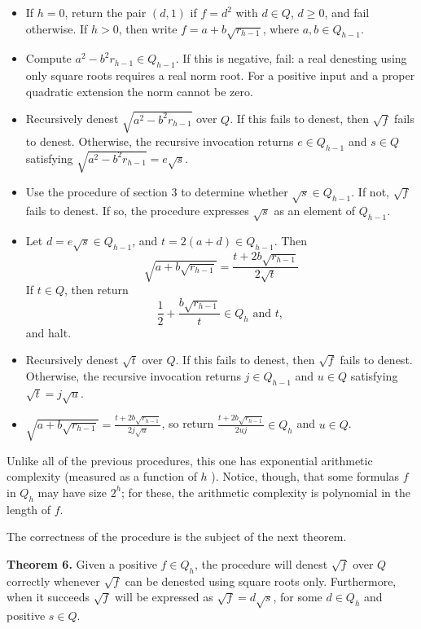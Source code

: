 \documentclass[11pt,letterpaper]{article}
\begin{document}
\begin{itemize}
  \item[1.] If $h=0$, return the pair $(d,1)$ if $f=d^2$ with $d\in Q$, $d\geq0$, and fail otherwise. If $h>0$, then write $f=a+b \sqrt{r_{h-1}}$, where $a, b \in Q_{h-1}$.
  \item[2.] Compute $a^2-b^2r_{h-1}\in Q_{h-1}$. If this is negative, fail: a real denesting using only square roots requires a real norm root. For a positive input and a proper quadratic extension the norm cannot be zero.
  \item[3.] Recursively denest $\sqrt{a^{2}-b^{2} r_{h-1}}$ over $Q$. If this fails to denest, then $\sqrt{f}$ fails to denest. Otherwise, the recursive invocation returns $e \in Q_{h-1}$ and $s \in Q$ satisfying $\sqrt{a^{2}-b^{2} r_{h-1}}=e \sqrt{s}$.
  \item[4.] Use the procedure of section 3 to determine whether $\sqrt{s} \in Q_{h-1}$. If not, $\sqrt{f}$ fails to denest. If so, the procedure expresses $\sqrt{s}$ as an element of $Q_{h-1}$.
  \item[5.] Let $d=e \sqrt{s} \in Q_{h-1}$, and $t=2(a+d) \in Q_{h-1}$. Then
\[
\sqrt{a+b \sqrt{r_{h-1}}}=\frac{t+2 b \sqrt{r_{h-1}}}{2 \sqrt{t}}
\]
If $t \in Q$, then return
\[
\frac{1}{2}+\frac{b \sqrt{r_{h-1}}}{t} \in Q_{h} \text { and } t \text {, }
\]
and halt.
  \item[6.] Recursively denest $\sqrt{t}$ over $Q$. If this fails to denest, then $\sqrt{f}$ fails to denest. Otherwise, the recursive invocation returns $j \in Q_{h-1}$ and $u \in Q$ satisfying $\sqrt{t}=j \sqrt{u}$.
  \item[7.] $\sqrt{a+b \sqrt{r_{h-1}}}=\frac{t+2 b \sqrt{r_{h-1}}}{2 j \sqrt{u}}$, so return $\frac{t+2 b \sqrt{r_{h-1}}}{2 u j} \in Q_{h}$ and $u \in Q$.
\end{itemize}

Unlike all of the previous procedures, this one has exponential arithmetic complexity (measured as a function of $h$ ). Notice, though, that some formulas $f$ in $Q_{h}$ may have size $2^{h}$; for these, the arithmetic complexity is polynomial in the length of $f$.

The correctness of the procedure is the subject of the next theorem.

\noindent\textbf{Theorem 6.} Given a positive $f \in Q_{h}$, the procedure will denest $\sqrt{f}$ over $Q$ correctly whenever $\sqrt{f}$ can be denested using square roots only. Furthermore, when it succeeds $\sqrt{f}$ will be expressed as $\sqrt{f}=d \sqrt{s}$, for some $d \in Q_{h}$ and positive $s \in Q$.
\end{document}
